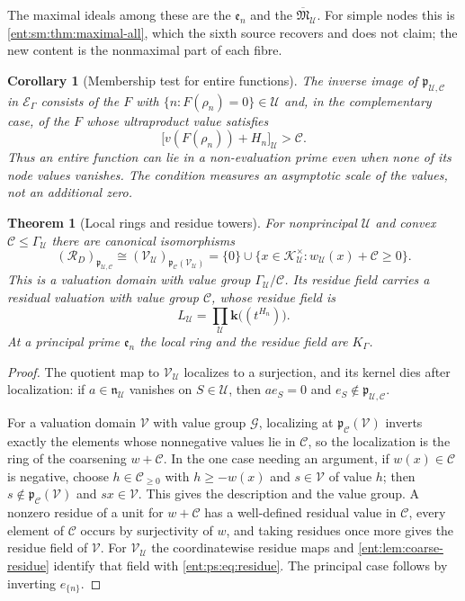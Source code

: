 \documentclass[11pt]{article}
\newtheorem{theorem}{Theorem}[section]
\theoremstyle{plain}
\theoremstyle{plain}
\theoremstyle{plain}
\newtheorem{corollary}[corollary]{Corollary}
\theoremstyle{definition}
\theoremstyle{definition}
\theoremstyle{definition}
\theoremstyle{definition}
\theoremstyle{remark}
\newcommand{\RD}{\mathcal R_D}\newcommand{\Ucal}{\mathcal U}
\newcommand{\kk}{\mathbf k}\newcommand{\PP}{\mathbb P}
\begin{document}
The maximal ideals among these are the $\mathfrak e_n$ and the
$\overline{\mathfrak M}_\Ucal$. For simple nodes this is
\cref{ent:sm:thm:maximal-all}, which the sixth source recovers and does not
claim; the new content is the nonmaximal part of each fibre.

\begin{corollary}[Membership test for entire functions]
\label{ent:ps:cor:membership}
The inverse image of $\mathfrak p_{\Ucal,\mathcal C}$ in $\mathcal E_\Gamma$
consists of the $F$ with $\{n:F(\rho_n)=0\}\in\Ucal$ and, in the
complementary case, of the $F$ whose ultraproduct value satisfies
\[
 \bigl[v(F(\rho_n))+H_n\bigr]_\Ucal>\mathcal C .
\]
Thus an entire function can lie in a non-evaluation prime even when none of
its node values vanishes. The condition measures an asymptotic scale of the
values, not an additional zero.
\end{corollary}

\begin{theorem}[Local rings and residue towers]\label{ent:ps:thm:local}
For nonprincipal $\Ucal$ and convex $\mathcal C\le\Gamma_\Ucal$ there are
canonical isomorphisms
\[
 (\RD)_{\mathfrak p_{\Ucal,\mathcal C}}
 \cong(\mathcal V_\Ucal)_{\mathfrak p_{\mathcal C}(\mathcal V_\Ucal)}
 =\{0\}\cup\{x\in\mathcal K_\Ucal^\times:w_\Ucal(x)+\mathcal C\ge0\}.
\]
This is a valuation domain with value group $\Gamma_\Ucal/\mathcal C$. Its
residue field carries a residual valuation with value group $\mathcal C$,
whose residue field is
\begin{equation}\label{ent:ps:eq:residue}
 L_\Ucal=\prod_\Ucal\kk\bigl((t^{H_n})\bigr).
\end{equation}
At a principal prime $\mathfrak e_n$ the local ring and the residue field are
$K_\Gamma$.
\end{theorem}
\begin{proof}
The quotient map to $\mathcal V_\Ucal$ localizes to a surjection, and its
kernel dies after localization: if $a\in\mathfrak n_\Ucal$ vanishes on
$S\in\Ucal$, then $ae_S=0$ and $e_S\notin\mathfrak p_{\Ucal,\mathcal C}$.

For a valuation domain $\mathcal V$ with value group $\mathcal G$, localizing
at $\mathfrak p_{\mathcal C}(\mathcal V)$ inverts exactly the elements whose
nonnegative values lie in $\mathcal C$, so the localization is the ring of
the coarsening $w+\mathcal C$. In the one case needing an argument, if
$w(x)\in\mathcal C$ is negative, choose $h\in\mathcal C_{\ge0}$ with
$h\ge-w(x)$ and $s\in\mathcal V$ of value $h$; then
$s\notin\mathfrak p_{\mathcal C}(\mathcal V)$ and $sx\in\mathcal V$. This
gives the description and the value group. A nonzero residue of a unit for
$w+\mathcal C$ has a well-defined residual value in $\mathcal C$, every
element of $\mathcal C$ occurs by surjectivity of $w$, and taking residues
once more gives the residue field of $\mathcal V$. For $\mathcal V_\Ucal$ the
coordinatewise residue maps and \cref{ent:lem:coarse-residue} identify that
field with \eqref{ent:ps:eq:residue}. The principal case follows by inverting
$e_{\{n\}}$.
\end{proof}
\end{document}
